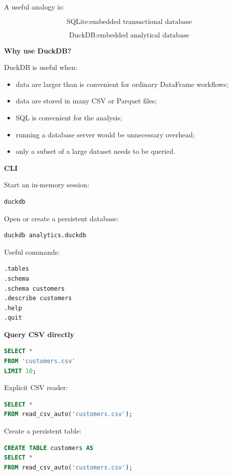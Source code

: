 \documentclass[11pt,letterpaper]{article}
\begin{document}
A useful analogy is:

\[
\text{SQLite}
:
\text{embedded transactional database}
\]

\[
\text{DuckDB}
:
\text{embedded analytical database}
\]

\textbf{Why use DuckDB?}

DuckDB is useful when:

\begin{itemize}[leftmargin=*]
    \item data are larger than is convenient for ordinary DataFrame workflows;
    \item data are stored in many CSV or Parquet files;
    \item SQL is convenient for the analysis;
    \item running a database server would be unnecessary overhead;
    \item only a subset of a large dataset needs to be queried.
\end{itemize}

\textbf{CLI}

Start an in-memory session:

\begin{lstlisting}
duckdb
\end{lstlisting}

Open or create a persistent database:

\begin{lstlisting}
duckdb analytics.duckdb
\end{lstlisting}

Useful commands:

\begin{lstlisting}
.tables
.schema
.schema customers
.describe customers
.help
.quit
\end{lstlisting}

\textbf{Query CSV directly}

\begin{lstlisting}[language=SQL]
SELECT *
FROM 'customers.csv'
LIMIT 10;
\end{lstlisting}

Explicit CSV reader:

\begin{lstlisting}[language=SQL]
SELECT *
FROM read_csv_auto('customers.csv');
\end{lstlisting}

Create a persistent table:

\begin{lstlisting}[language=SQL]
CREATE TABLE customers AS
SELECT *
FROM read_csv_auto('customers.csv');
\end{lstlisting}
\end{document}
